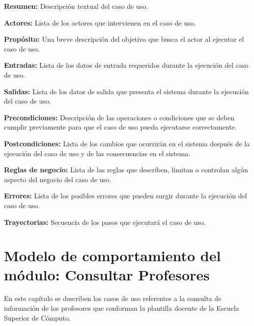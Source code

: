      \begin{objetivos}
	\item {\bf Resumen:} Descripción textual del caso de uso.
	\item {\bf Actores:} Lista de los actores que intervienen en el caso de uso.
	\item {\bf Propósito:} Una breve descripción del objetivo que busca el actor al ejecutar el caso de uso.
	\item {\bf Entradas:} Lista de los datos de entrada requeridos durante la ejecución del caso de uso.
	\item {\bf Salidas:} Lista de los datos de salida que presenta el sistema durante la ejecución del caso de uso.
	\item {\bf Precondiciones:} Descripción de las operaciones o condiciones que se deben cumplir previamente para que el caso de uso pueda ejecutarse correctamente.
	\item {\bf Postcondiciones:} Lista de los cambios que ocurrirán en el sistema después de la ejecución del caso de uso y de las consecuencias en el sistema.
	\item {\bf Reglas de negocio:} Lista de las reglas que describen, limitan o controlan algún aspecto del negocio del caso de uso.
	\item {\bf Errores:} Lista de los posibles errores que pueden surgir durante la ejecución del caso de uso.
	\item {\bf Trayectorias:} Secuencia de los pasos que ejecutará el caso de uso.
    \end{objetivos}

	
\chapter{Modelo de comportamiento del módulo: Consultar Profesores \label{chp:modeloComportamientoInformacionBase}}
     
  En este capítulo se describen los casos de uso referentes a la consulta de información de los profesores que conforman la plantilla docente de la Escuela Superior de Cómputo. \bigskip

